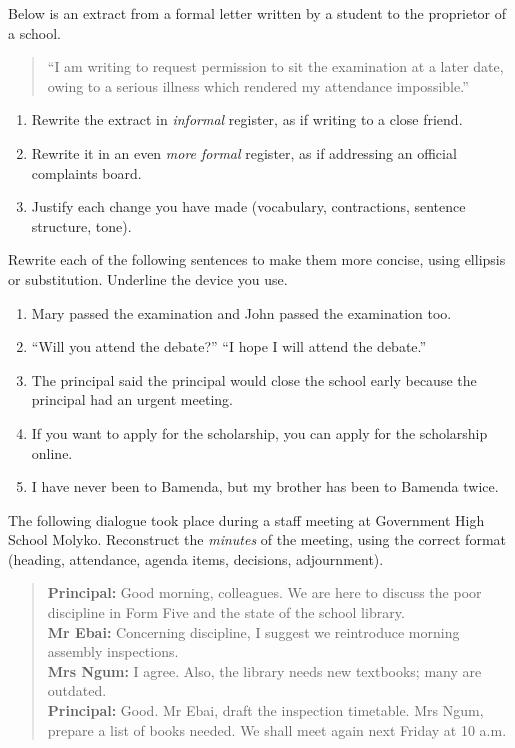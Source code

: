 \documentclass[11pt]{article}
\newcounter{popsec}
\newcounter{popsub}
\newcommand{\courssub}[1]{%
  \stepcounter{popsub}%
  \par\vspace{9pt}\noindent{\popxbold\fontsize{11.5}{13}\selectfont\color{popink}{\color{poporange}\thepopsec.\thepopsub}\hspace{6pt}#1}\par\nopagebreak\vspace{4pt}
}
\begin{document}
\courssub{I practise}

\begin{exercice}
Below is an extract from a formal letter written by a student to the proprietor of a school.
\begin{quote}
``I am writing to request permission to sit the examination at a later date, owing to a serious illness which rendered my attendance impossible.''
\end{quote}
\begin{enumerate}
\item Rewrite the extract in \emph{informal} register, as if writing to a close friend.
\item Rewrite it in an even \emph{more formal} register, as if addressing an official complaints board.
\item Justify each change you have made (vocabulary, contractions, sentence structure, tone).
\end{enumerate}
\end{exercice}

\begin{exercice}
Rewrite each of the following sentences to make them more concise, using ellipsis or substitution. Underline the device you use.
\begin{enumerate}
\item Mary passed the examination and John passed the examination too.
\item ``Will you attend the debate?'' ``I hope I will attend the debate.''
\item The principal said the principal would close the school early because the principal had an urgent meeting.
\item If you want to apply for the scholarship, you can apply for the scholarship online.
\item I have never been to Bamenda, but my brother has been to Bamenda twice.
\end{enumerate}
\end{exercice}

\begin{exercice}
The following dialogue took place during a staff meeting at Government High School Molyko. Reconstruct the \emph{minutes} of the meeting, using the correct format (heading, attendance, agenda items, decisions, adjournment).
\begin{quote}
\textbf{Principal:} Good morning, colleagues. We are here to discuss the poor discipline in Form Five and the state of the school library.\\
\textbf{Mr Ebai:} Concerning discipline, I suggest we reintroduce morning assembly inspections.\\
\textbf{Mrs Ngum:} I agree. Also, the library needs new textbooks; many are outdated.\\
\textbf{Principal:} Good. Mr Ebai, draft the inspection timetable. Mrs Ngum, prepare a list of books needed. We shall meet again next Friday at 10 a.m.
\end{quote}
\end{exercice}
\end{document}
